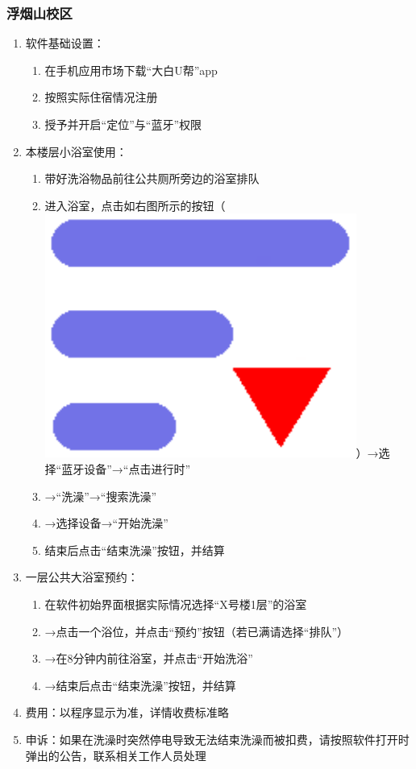 \subsubsection[浮烟山校区]{浮烟山校区}
\label{shower_software_f}
\begin{enumerate}
    \item 软件基础设置：
          \begin{enumerate}
              \item 在手机应用市场下载“大白U帮”app
              \item 按照实际住宿情况注册
              \item 授予并开启“定位”与“蓝牙”权限
          \end{enumerate}
    \item 本楼层小浴室使用：
          \begin{enumerate}
              \item 带好洗浴物品前往公共厕所旁边的浴室排队
              \item 进入浴室，点击如右图所示的按钮（\noindent\mbox{\includegraphics[height=2.4ex]{resources/sundry/bath.pdf}}）→选择“蓝牙设备”→“点击进行时”
              \item →“洗澡”→“搜索洗澡”\footnotemark
              \item →选择设备\footnotemark →“开始洗澡”
              \item 结束后点击“结束洗澡”按钮，并结算
          \end{enumerate}
    \item 一层公共大浴室预约：
          \begin{enumerate}
              \item 在软件初始界面根据实际情况选择“X号楼1层”的浴室
              \item →点击一个浴位，并点击“预约”按钮（若已满请选择“排队”）
              \item →在8分钟内前往浴室，并点击“开始洗浴”
              \item →结束后点击“结束洗澡”按钮，并结算
          \end{enumerate}
    \item 费用：以程序显示为准，详情收费标准略
    \item 申诉：如果在洗澡时突然停电导致无法结束洗澡而被扣费，请按照软件打开时弹出的公告，联系相关工作人员处理
\end{enumerate}
